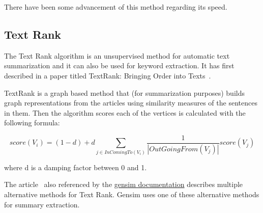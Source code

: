 There have been some advancement of this method regarding its speed\cite{GreedySum}.

\subsection{Text Rank}

The Text Rank algorithm is an unsupervised method for automatic text summarization and it can also be used for keyword extraction. It has first described in a paper titled TextRank: Bringing Order into Texts~\cite{TextRank:2004}.

TextRank is a graph based method that (for summarization purposes) builds graph representations from the articles using similarity measures of the sentences in them. Then the algorithm scores each of the vertices is calculated with the following formula:

\[score(V_i) = (1 - d) + d \sum_{j \in InComingTo(V_i)} \frac{1}{|OutGoingFrom(V_j)|} score(V_j)\]

where d is a damping factor between 0 and 1.

The article~\cite{TextRank} also referenced by the \href{https://radimrehurek.com/gensim/summarization/summariser.html}{gensim documentation} describes multiple alternative methods for Text Rank. Gensim uses one of these alternative methods for summary extraction.  

